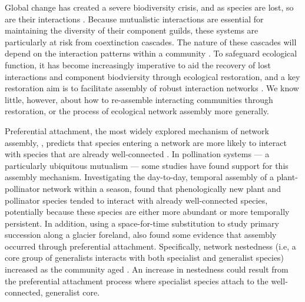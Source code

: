 \documentclass[12pt]{article}
\begin{document}
Global change has created a severe biodiversity crisis, and as species
are lost, so are their interactions \citep{dunn2009sixth,
  barnosky2011has}. Because mutualistic interactions are essential for
maintaining the diversity of their component guilds, these systems are
particularly at risk from coextinction cascades. The nature of these
cascades will depend on the interaction patterns within a community
\citep{Memmott2004, Rezende2007, Bascompte2009, Thebault2010}. To
safeguard ecological function, it has become increasingly imperative
to aid the recovery of lost interactions and component biodviersity
through ecological restoration, and a key restoration aim is to
facilitate assembly of robust interaction networks
\citep{menz-2010-4}. We know little, however, about how to re-assemble
interacting communities through restoration, or the process of
ecological network assembly more generally.

Preferential attachment, the most widely explored mechanism of network
assembly, \citep{barabasi1999emergence}, predicts that species
entering a network are more likely to interact with species that are
already well-connected \citep[the "rich-get-richer''
principle,][]{barabasi1999emergence}. In pollination systems --- a
particularly ubiquitous mutualism \citep{ollerton-2011-321,
  klein-2007-303} --- some studies have found support for this
assembly mechanism. Investigating the day-to-day, temporal assembly of
a plant-pollinator network within a season, \cite{Olesen2008} found
that phenologically new plant and pollinator species tended to
interact with already well-connected species, potentially because
these species are either more abundant or more temporally
persistent. In addition, using a space-for-time substitution to study
primary succession along a glacier foreland, \cite{albrecht2010plant}
also found some evidence that assembly occurred through preferential
attachment. Specifically, network nestedness (i.e, a core group of
generalists interacts with both specialist and generalist species)
increased as the community aged \citep{albrecht2010plant}.  An
increase in nestedness could result from the preferential attachment
process where specialist species attach to the well-connected,
generalist core.
\end{document}
